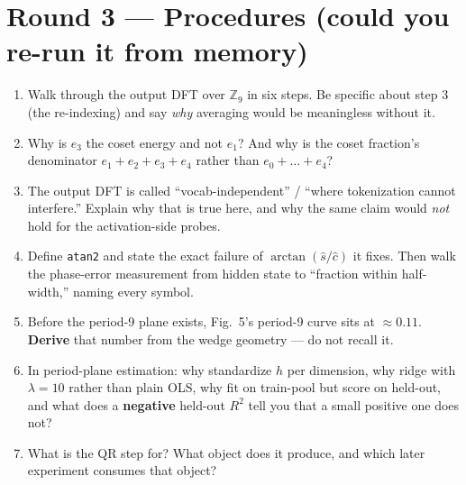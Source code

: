 \documentclass[11pt]{article}
\begin{document}
\section*{Round 3 --- Procedures (could you re-run it from memory)}
\begin{enumerate}[leftmargin=*,itemsep=4pt,start=9]
\item Walk through the output DFT over $\mathbb{Z}_9$ in six steps. Be specific
about step 3 (the re-indexing) and say \emph{why} averaging would be meaningless
without it.
\item Why is $e_3$ the coset energy and not $e_1$? And why is the coset fraction's
denominator $e_1{+}e_2{+}e_3{+}e_4$ rather than $e_0{+}\dots{+}e_4$?
\item The output DFT is called ``vocab-independent'' / ``where tokenization cannot
interfere.'' Explain why that is true here, and why the same claim would
\emph{not} hold for the activation-side probes.
\item Define \texttt{atan2} and state the exact failure of $\arctan(\hat{s}/\hat{c})$
it fixes. Then walk the phase-error measurement from hidden state to ``fraction
within half-width,'' naming every symbol.
\item Before the period-9 plane exists, Fig.~5's period-9 curve sits at
$\approx 0.11$. \textbf{Derive} that number from the wedge geometry --- do not
recall it.
\item In period-plane estimation: why standardize $h$ per dimension, why ridge with
$\lambda = 10$ rather than plain OLS, why fit on train-pool but score on held-out,
and what does a \textbf{negative} held-out $R^2$ tell you that a small positive one
does not?
\item What is the QR step for? What object does it produce, and which later
experiment consumes that object?
\end{enumerate}
\end{document}
